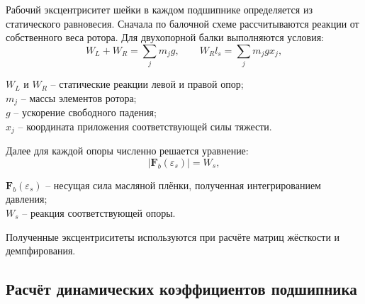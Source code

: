 Рабочий эксцентриситет шейки в каждом подшипнике определяется из статического равновесия. Сначала по балочной схеме рассчитываются реакции от собственного веса ротора. Для двухопорной балки выполняются условия:
\begin{equation}
    W_L+W_R=\sum_j m_jg,
    \qquad
    W_R l_s=\sum_j m_jg x_j,
    \label{eq:static_support_reactions}
\end{equation}
\begin{conditions}
$W_L$ и $W_R$ -- статические реакции левой и правой опор;\\
$m_j$ -- массы элементов ротора;\\
$g$ -- ускорение свободного падения;\\
$x_j$ -- координата приложения соответствующей силы тяжести.
\end{conditions}

Далее для каждой опоры численно решается уравнение:
\begin{equation}
    \left|\mathbf{F}_b(\varepsilon_s)\right|=W_s,
    \label{eq:eccentricity_from_balance}
\end{equation}
\begin{conditions}
$\mathbf{F}_b(\varepsilon_s)$ -- несущая сила масляной плёнки, полученная интегрированием давления;\\
$W_s$ -- реакция соответствующей опоры.
\end{conditions}

Полученные эксцентриситеты используются при расчёте матриц жёсткости и демпфирования.

\subsection{Расчёт динамических коэффициентов подшипника}

